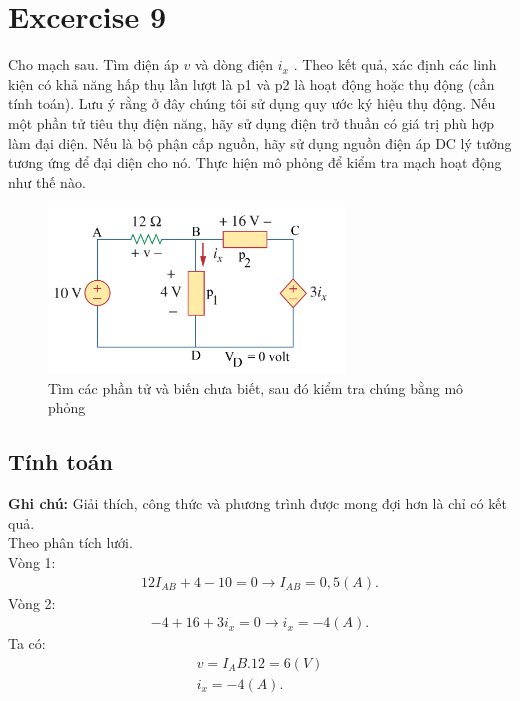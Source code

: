 \section{Excercise 9}
Cho mạch sau. Tìm điện áp \(v\) và dòng điện \(i_x\) . Theo kết quả, xác định các linh kiện có khả năng hấp thụ lần lượt là p1 và p2 là hoạt động hoặc
thụ động (cần tính toán). Lưu ý rằng ở đây chúng tôi sử dụng quy ước ký hiệu thụ động.
Nếu một phần tử tiêu thụ điện năng, hãy sử dụng điện trở thuần có giá trị phù hợp làm đại diện. Nếu là bộ phận cấp nguồn, hãy sử dụng nguồn điện áp DC lý tưởng tương ứng để
đại diện cho nó. Thực hiện mô phỏng để kiểm tra mạch hoạt động như thế nào.
\begin{figure}[!htbp]
    \centering
    \includegraphics[width=0.7\textwidth]{graphics/ex9/f1.png}
    \caption{Tìm các phần tử và biến chưa biết, sau đó kiểm tra chúng bằng mô phỏng}
    \end{figure}
\subsection{Tính toán}
\textbf{Ghi chú:}
Giải thích, công thức và phương trình được mong đợi hơn là chỉ có kết quả.\\
Theo phân tích lưới.\\
Vòng 1:
\begin{align*}
12I_{AB} + 4 - 10 = 0 \rightarrow I_{AB} = 0,5 (A).
\end{align*}
Vòng 2:
\begin{align*}
    -4 + 16 + 3i_x = 0 \rightarrow i_x = -4 (A).
\end{align*}
Ta có:
\begin{align*}
    v = I_AB.12 =6 (V)\\
    i_x = -4 (A).
\end{align*}
